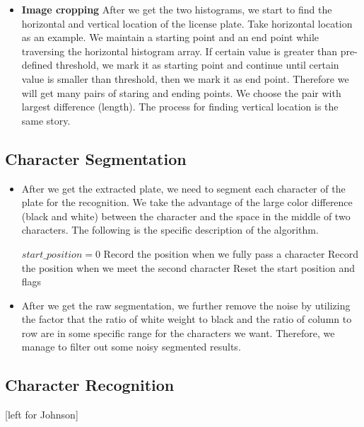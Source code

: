 \documentclass{article}
\begin{document}
\begin{spacing}{1.0}
\begin{itemize}
	\item \textbf{Image cropping} After we get the two histograms, we start to find the horizontal and vertical location of the license plate. Take horizontal location as an example. We maintain a starting point and an end point while traversing the horizontal histogram array. If certain value is greater than pre-defined threshold, we mark it as starting point and continue until certain value is smaller than threshold, then we mark it as end point. Therefore we will get many pairs of staring and ending points. We choose the pair with largest difference (length). The process for finding vertical location is the same story. 
	
\end{itemize}

\subsection{Character Segmentation}
\begin{itemize}
	\item After we get the extracted plate, we need to segment each character of the plate for the recognition. We take the advantage of the large color difference (black and white) between the character and the space in the middle of two characters. The following is the specific description of the algorithm. 
	\begin{algorithm}
	
		\begin{algorithmic}[1]
			\State $start\_position = 0$
			\State Record the position when we fully pass a character
			\State Record the position when we meet the second character
			\State Reset the start position and flags
			\EndFor
		
			\EndProcedure
		\end{algorithmic}
	\end{algorithm}
 \item After we get the raw segmentation, we further remove the noise by utilizing the factor that the ratio of white weight to black and the ratio of column to row are in some specific range for the characters we want. Therefore, we manage to filter out some noisy segmented results.
\end{itemize}

\subsection{Character Recognition}
[left for Johnson]


\end{spacing}
\end{document}
